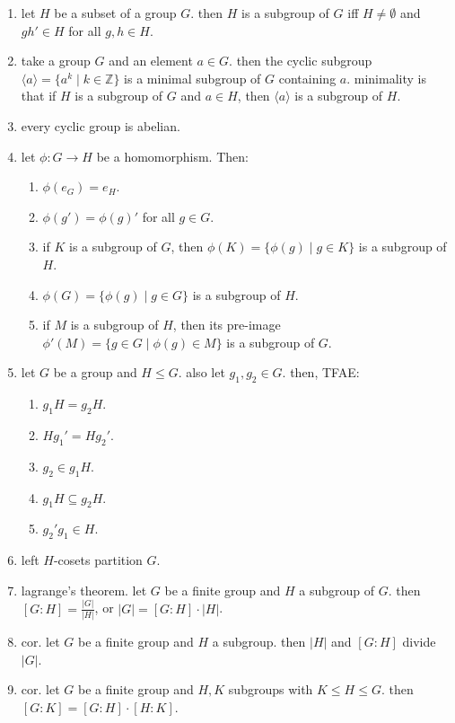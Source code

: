\begin{enumerate}
\begin{enumerate}
	\end{enumerate}
	\item let $H$ be a subset of a group $G$. then $H$ is a subgroup of $G$ iff $H \neq \emptyset$ and $gh' \in H$ for all $g,h \in H$. 
	\item take a group $G$ and an element $a \in G$. then the cyclic subgroup $\langle a \rangle = \{a^k \mid k \in \mathbb{Z}\}$ is a minimal subgroup of $G$ containing $a$. minimality is that if $H$ is a subgroup of $G$ and $a \in H$, then $\langle a \rangle$ is a subgroup of $H$. 
	\item every cyclic group is abelian. 
	\item let $\phi: G \to H$ be a homomorphism. Then: 
	\begin{enumerate}
		\item $\phi(e_G) = e_H$. 
		\item $\phi(g') = \phi(g)'$ for all $g \in G$. 
		\item if $K$ is a subgroup of $G$, then $\phi(K) = \{\phi(g) \mid g \in K\}$ is a subgroup of $H$. 
		\item $\phi(G) = \{\phi(g) \mid g \in G\}$ is a subgroup of $H$. 
		\item if $M$ is a subgroup of $H$, then its pre-image $\phi'(M) = \{g \in G \mid \phi(g) \in M\}$ is a subgroup of $G$. 
	\end{enumerate}
	\item let $G$ be a group and $H \leq G$. also let $g_1,g_2 \in G$. then, TFAE: 
	\begin{enumerate}
		\item $g_1H = g_2H$. 
		\item $Hg_1' = Hg_2'$. 
		\item $g_2 \in g_1H$. 
		\item $g_1H \subseteq g_2H$. 
		\item $g_2'g_1 \in H$. 
	\end{enumerate}
	\item left $H$-cosets partition $G$. 
	\item lagrange's theorem. let $G$ be a finite group and $H$ a subgroup of $G$. then $[G:H] = \frac{|G|}{|H|}$, or $|G| = [G:H] \cdot |H|$. 
	\item cor. let $G$ be a finite group and $H$ a subgroup. then $|H|$ and $[G:H]$ divide $|G|$. 
	\item cor. let $G$ be a finite group and $H,K$ subgroups with $K \leq H \leq G$. then $[G:K] = [G:H] \cdot [H:K]$. 
\end{enumerate}


